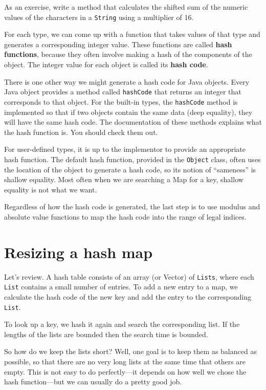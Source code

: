 As an exercise, write a method that calculates the shifted sum
of the numeric values of the characters in a {\tt String} using
a multiplier of 16.

For each type, we can come up with a function that takes values of that
type and generates a corresponding integer value.  These
functions are called {\bf hash functions}, because they often
involve making a hash of the components of the object.  The
integer value for each object is called its {\bf hash code}.

There is one other way we might generate a hash code for Java objects.
Every Java object provides a method called {\tt hashCode} that returns
an integer that corresponds to that object.  For the built-in types,
the {\tt hashCode} method is implemented so that if two objects
contain the same data (deep equality), they will have the same hash
code.  The documentation of these methods explains what the hash
function is.  You should check them out.


For user-defined types, it is up to the implementor to provide
an appropriate hash function.  The default hash function, provided
in the {\tt Object} class, often uses the location of the
object to generate a hash code, so its notion of ``sameness''
is shallow equality.  Most often when we are searching a
Map for a key, shallow equality is not what we want.

Regardless of how the hash code is generated, the last step
is to use modulus and absolute value functions to map the hash code
into the range of legal indices.


\section{Resizing a hash map}

Let's review.  A hash table consists of an array (or Vector)
of {\tt Lists}, where each {\tt List} contains a small number
of entries.  To add a new entry to a map, we calculate
the hash code of the new key and add the entry to the
corresponding {\tt List}.

To look up a key, we hash it again and search the corresponding list.
If the lengths of the lists are bounded then the search time is
bounded.

So how do we keep the lists short?  Well, one goal is to keep
them as balanced as possible, so that there are no very long
lists at the same time that others are empty.
This is not easy to do perfectly---it depends on how well we
chose the hash function---but we can usually do a pretty good
job.

